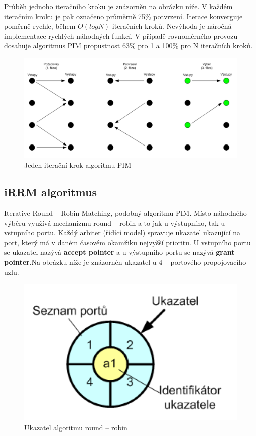 Průběh jednoho iteračního kroku je znázorněn na obrázku níže. V každém iteračním kroku je pak označeno průměrně 75\% potvrzení. Iterace konverguje poměrně rychle, během $O(logN)$ iteračních kroků. Nevýhoda je náročná implementace rychlých náhodných funkcí. V případě rovnoměrného provozu dosahuje algoritmus PIM propustnost 63\% pro 1 a 100\% pro N iteračních kroků.
\begin{figure}[ht]
\centering
  \begin{center}
    \includegraphics[scale=0.5]{images/PIM.png}
  \end{center}
  \caption[Jeden iterační krok algoritmu PIM)]{Jeden iterační krok algoritmu PIM}
\end{figure}
\subsection{iRRM algoritmus}
Iterative Round -- Robin Matching, podobný algoritmu PIM. Místo náhodného výběru využívá mechanizmu round -- robin a to jak u výstupního, tak u vstupního portu. Každý arbiter (řídící model) spravuje ukazatel ukazující na port, který má v daném časovém okamžiku nejvyšší prioritu. U vstupního portu se ukazatel nazývá \textbf{accept pointer} a u výstupního portu se nazývá \textbf{grant pointer}.Na obrázku níže je znázorněn ukazatel u 4 -- portového propojovacího uzlu.
\begin{figure}[ht]
\centering
  \begin{center}
    \includegraphics[scale=0.5]{images/iRRM.png}
  \end{center}
  \caption[Ukazatel algoritmu round -- robin]{Ukazatel algoritmu round -- robin}
\end{figure}
